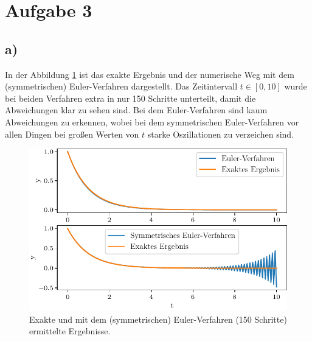 \section*{Aufgabe 3}
\subsection*{a)}
In der Abbildung \ref{fig:euler} ist das exakte Ergebnis und der numerische Weg mit dem (symmetrischen)
Euler-Verfahren dargestellt.
Das Zeitintervall $t \in [0, 10]$ wurde bei beiden Verfahren extra in nur 150 Schritte unterteilt,
damit die Abweichungen klar zu sehen sind.
Bei dem Euler-Verfahren sind kaum Abweichungen zu erkennen, wobei 
bei dem symmetrischen Euler-Verfahren vor allen Dingen bei großen Werten von $t$ 
starke Oszillationen zu verzeichen sind.
\begin{figure}
    \centering
    \includegraphics[width = 0.95 \textwidth]{build/ex_3_plot_symm.pdf}
    \caption{Exakte und mit dem (symmetrischen) Euler-Verfahren (150 Schritte) ermittelte
    Ergebnisse.}
    \label{fig:euler}
\end{figure}